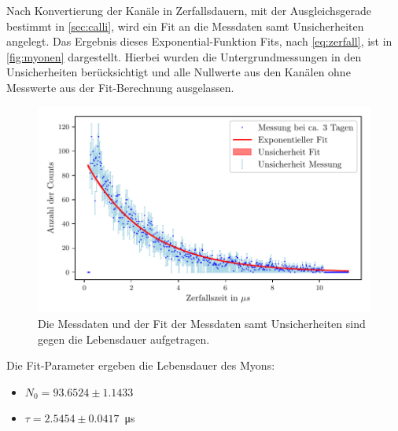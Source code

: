 Nach Konvertierung der Kanäle in Zerfallsdauern, mit der Ausgleichsgerade bestimmt in \autoref{sec:calli}, wird ein Fit an die Messdaten samt Unsicherheiten angelegt.
Das Ergebnis dieses Exponential-Funktion Fits, nach \autoref{eq:zerfall}, ist in \autoref{fig:myonen} dargestellt.
Hierbei wurden die Untergrundmessungen in den Unsicherheiten berücksichtigt und alle Nullwerte aus den Kanälen ohne Messwerte aus der Fit-Berechnung ausgelassen.

\begin{figure}[H]
    \centering
    \includegraphics{images/messung_fit.pdf}
    \caption{Die Messdaten und der Fit der Messdaten samt Unsicherheiten sind gegen die Lebensdauer aufgetragen.}
    \label{fig:myonen}
\end{figure}

Die Fit-Parameter ergeben die Lebensdauer des Myons:
\begin{itemize}
    \item $N_0 = 93.6524 \pm 1.1433$
    \item $\tau = 2.5454 \pm 0.0417$\ \si{\micro\second}
\end{itemize}